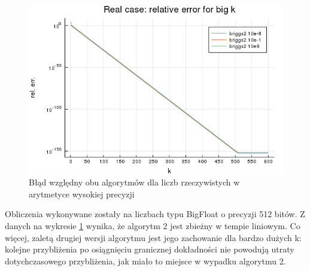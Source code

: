 \documentclass{article}
\begin{document}
	\begin{figure}[h]
	\includegraphics[scale=0.6]{exp4.png}
	\caption{Błąd względny obu algorytmów dla liczb rzeczywistych w arytmetyce wysokiej precyzji}
	\label{fig:exp4}
	\end{figure}
	
	Obliczenia wykonywane zostały na liczbach typu BigFloat o precyzji 512 bitów. Z danych na wykresie \ref{fig:exp4} wynika, że algorytm 2 jest zbieżny w tempie liniowym. Co więcej, zaletą drugiej wersji algorytmu jest jego zachowanie dla bardzo dużych k: kolejne przybliżenia po osiągnięciu granicznej dokładności nie powodują utraty dotychczasowego przybliżenia, jak miało to miejsce w wypadku algorytmu 2.

\pagebreak
\end{document}
